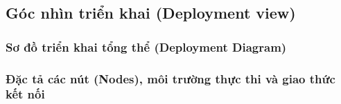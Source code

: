 \subsection{Góc nhìn triển khai (Deployment view)}

\subsubsection{Sơ đồ triển khai tổng thể (Deployment Diagram)}


\subsubsection{Đặc tả các nút (Nodes), môi trường thực thi và giao thức kết nối}

